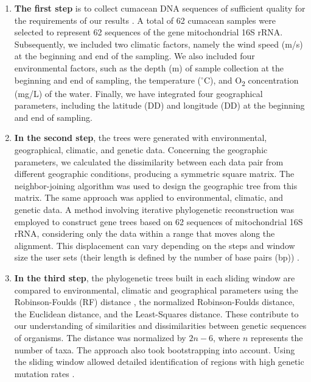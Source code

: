 \begin{enumerate}
\item \textbf{The first step} is to collect cumacean DNA sequences of sufficient quality for the requirements of our results \citep{koshkarov_phylogeography_2022}. A total of 62 cumacean samples were selected to represent 62 sequences of the gene mitochondrial 16S rRNA. Subsequently, we included two climatic factors, namely the wind speed (m/s) at the beginning and end of the sampling. We also included four environmental factors, such as the depth (m) of sample collection at the beginning and end of sampling, the temperature ($^\circ$C), and O\textsubscript{2} concentration (mg/L) of the water. Finally, we have integrated four geographical parameters, including the latitude (DD) and longitude (DD) at the beginning and end of sampling.

\item \textbf{In the second step}, the trees were generated with environmental, geographical, climatic, and genetic data. Concerning the geographic parameters, we calculated the dissimilarity between each data pair from different geographic conditions, producing a symmetric square matrix. The neighbor-joining algorithm was used to design the geographic tree from this matrix. The same approach was applied to environmental, climatic, and genetic data. A method involving iterative phylogenetic reconstruction was employed to construct gene trees based on 62 sequences of mitochondrial 16S rRNA, considering only the data within a range that moves along the alignment. This displacement can vary depending on the steps and window size the user sets (their length is defined by the number of base pairs (bp)) \citep{koshkarov_phylogeography_2022}.

\item \textbf{In the third step}, the phylogenetic trees built in each sliding window are compared to environmental, climatic and geographical parameters using the Robinson-Foulds (RF) distance \citep{robinson_comparison_1981, koshkarov_phylogeography_2022}, the normalized Robinson-Foulds distance, the Euclidean distance, and the Least-Squares distance. These contribute to our understanding of similarities and dissimilarities between genetic sequences of organisms. The distance was normalized by $2n-6$, where $n$ represents the number of taxa. The approach also took bootstrapping into account. Using the sliding window allowed detailed identification of regions with high genetic mutation rates \citep{koshkarov_phylogeography_2022}.
\end{enumerate}


